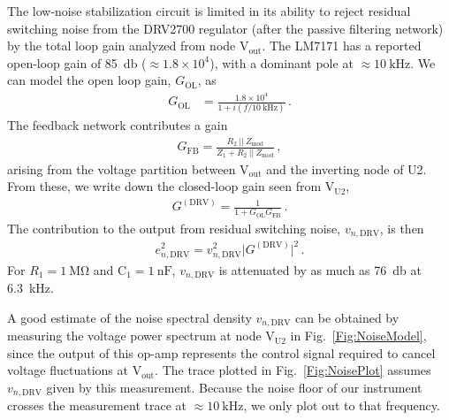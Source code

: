\documentclass[aip,rsi,reprint]{revtex4-1} %
\begin{document}
The low-noise stabilization circuit is limited in its ability to reject residual switching noise from the DRV2700 regulator (after the passive filtering network) by the total loop gain analyzed from node $\text{V}_\text{out}$.
The LM7171 has a reported open-loop gain of \SI{85}{\decibel} ($\approx 1.8\times 10^4$), with a dominant pole at $\approx\SI{10}{\kilo\hertz}$\cite{LM7171Datasheet}.
We can model the open loop gain, $G_\text{OL}$, as
\begin{align}
G_\text{OL} &= \frac{1.8\times10^4}{1 + i (f/\SI{10}{\kilo\hertz})}\,.
\end{align}
The feedback network contributes a gain
\begin{align}
G_\text{FB} = \frac{R_2~||~Z_\text{mod}}{Z_1 + R_2~||~Z_\text{mod}}\,,
\end{align}
arising from the voltage partition between $\text{V}_\text{out}$ and the inverting node of U2.
From these, we write down the closed-loop gain seen from $\text{V}_\text{U2}$,
\begin{align}
G^{(\text{DRV})} = \frac{1}{1+G_\text{OL} G_\text{FB}}\,.
\end{align}
The contribution to the output from residual switching noise, $v_{n,\text{DRV}}$, is then
\begin{align}
e^2_{n,\text{DRV}} = v^2_{n,\text{DRV}}\big|G^{(\text{DRV})}\big|^2\,.
\end{align}
For $R_1=\SI{1}{\mega\ohm}$ and $\text{C}_1 = \SI{1}{\nano\farad}$, $v_{n,\text{DRV}}$ is attenuated by as much as \SI{76}{\decibel} at \SI{6.3}{\kilo\hertz}.

A good estimate of the noise spectral density $v_{n,\text{DRV}}$ can be obtained by measuring the voltage power spectrum at node $\text{V}_\text{U2}$ in Fig.~\ref{Fig:NoiseModel}, since the output of this op-amp represents the control signal required to cancel voltage fluctuations at $\text{V}_\text{out}$.
The trace plotted in Fig.~\ref{Fig:NoisePlot} assumes $v_{n,\text{DRV}}$ given by this measurement. 
Because the noise floor of our instrument crosses the measurement trace at $\approx\SI{10}{\kilo\hertz}$, we only plot out to that frequency.

\end{document}
